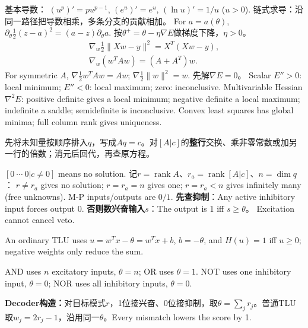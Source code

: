 基本导数： $(u^p)'=pu^{p-1}$, $(e^u)'=e^u$, $(\ln u)'=1/u$ ($u>0$). 链式求导：沿同一路径把导数相乘，多条分支的贡献相加。 For $a=a(\theta)$, $\partial_\theta\frac12(z-a)^2=(a-z)\partial_\theta a$.
按$\theta^+=\theta-\eta\nabla E$做梯度下降，$\eta>0$。
\[\begin{gathered}
\nabla_w\tfrac12\|Xw-y\|^2=X^T(Xw-y),\\
\nabla_w(w^TAw)=(A+A^T)w.
\end{gathered}\]
For symmetric $A$, $\nabla\frac12w^TAw=Aw$; $\nabla\frac12\|w\|^2=w$. 先解$\nabla E=0$。 Scalar $E''>0$: local minimum; $E''<0$: local maximum; zero: inconclusive. Multivariable Hessian $\nabla^2E$: positive definite gives a local minimum; negative definite a local maximum; indefinite a saddle; semidefinite is inconclusive. Convex least squares has global minima; full column rank gives uniqueness.

先将未知量按顺序排入$q$，写成$Aq=c$。对$[A|c]$的\textbf{整行}交换、乘非零常数或加另一行的倍数；消元后回代，再查原方程。

$[0\ \cdots\ 0|c\ne0]$ means no solution. 记$r=\operatorname{rank}A$、$r_a=\operatorname{rank}[A|c]$、$n=\dim q$： $r\ne r_a$ gives no solution; $r=r_a=n$ gives one; $r=r_a<n$ gives infinitely many (free unknowns).
\columnend\sepcol
\columnstart
{}
M-P inputs/outputs are $0/1$. \textbf{先查抑制}：Any active inhibitory input forces output 0. \textbf{否则数兴奋输入$s$}：The output is 1 iff $s\ge\theta$。 Excitation cannot cancel veto.

An ordinary TLU uses $u=w^Tx-\theta=w^Tx+b$, $b=-\theta$, and $H(u)=1$ iff $u\ge0$; negative weights only reduce the sum.


AND uses $n$ excitatory inputs, $\theta=n$; OR uses $\theta=1$. NOT uses one inhibitory input, $\theta=0$; NOR uses all inhibitory inputs, $\theta=0$.

\textbf{Decoder构造：}对目标模式$r$，1位接兴奋、0位接抑制，取$\theta=\sum_jr_j$。普通TLU取$w_j=2r_j-1$，沿用同一$\theta$。Every mismatch lowers the score by 1.

